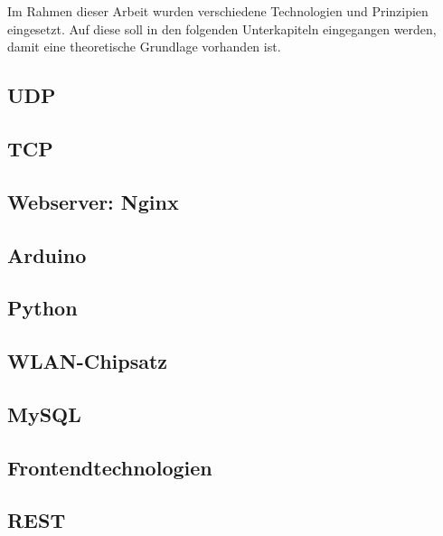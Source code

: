 
Im Rahmen dieser Arbeit wurden verschiedene Technologien und Prinzipien eingesetzt. Auf diese soll in den folgenden Unterkapiteln eingegangen werden, damit eine theoretische Grundlage vorhanden ist. 

\subsection{\ac{UDP}}
\label{sec:UDP-1}



\subsection{\ac{TCP}}
\label{sec:TCP-1}



\subsection{Webserver: Nginx}
\label{sec:WebserverNginx-1} 


 
\subsection{Arduino}
\label{sec:Arduino-1} 



\subsection{Python}
\label{src:Python-1}



\subsection{WLAN-Chipsatz}
\label{sec:WLAN-CHipsatz-1} 

\subsection{MySQL}
\label{sec:MySQL-1}
 
\subsection{Frontendtechnologien}
\label{sec:Frontendtechnologien-1}
 
 \newpage
 
\subsection{\ac{REST}}        
\label{sec:REST-1}  

\cite{Tilkov.2015}
  
\newpage